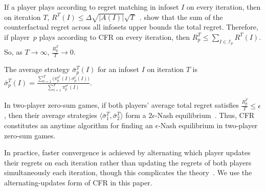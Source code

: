 \documentclass{article}
\begin{document}
If a player plays according to regret matching in infoset $I$ on every iteration, then on iteration $T$, $R^T(I) \le \Delta\sqrt{|A(I)|}\sqrt{T}$~\cite{Cesa-Bianchi06:Prediction}.
\citet{Zinkevich07:Regret} show that the sum of the counterfactual regret across all infosets upper bounds the total regret. Therefore,
if player~$p$ plays according to CFR on every iteration, then
$R_p^T \le \sum_{I \in \mathcal{I}_p} R^T(I)$.
So, as $T \rightarrow \infty$, $\frac{R_p^T}{T} \rightarrow 0$.

The average strategy $\bar{\sigma}_p^T(I)$ for an infoset $I$ on iteration $T$ is
$\bar{\sigma}_p^T(I) = \frac{\sum_{t = 1}^T \big(\pi_p^{\sigma^t}(I)\sigma_p^t(I)\big)}{\sum_{t = 1}^T \pi_p^{\sigma^t}(I)}$.

In two-player zero-sum games, if both players' average total regret satisfies $\frac{R_p^T}{T} \le \epsilon$, then their average strategies $\langle \bar{\sigma}^T_1, \bar{\sigma}^T_2 \rangle$ form a $2\epsilon$-Nash equilibrium~\cite{Waugh09:Thesis}. Thus, CFR constitutes an anytime algorithm for finding an $\epsilon$-Nash equilibrium in two-player zero-sum games. 

In practice, faster convergence is achieved by alternating which player updates their regrets on each iteration rather than updating the regrets of both players simultaneously each iteration, though this complicates the theory~\cite{Farina18:Online,Burch18:Revisiting}. We use the alternating-updates form of CFR in this paper.
\end{document}
